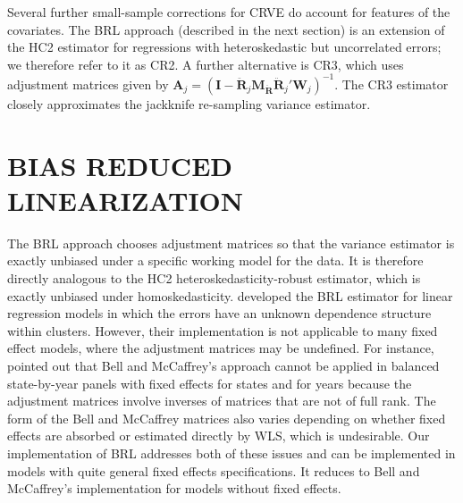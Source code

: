 \documentclass[12pt]{article}\usepackage[]{graphicx}\usepackage[]{color}
\newcommand{\bm}{\mathbf}
\begin{document}
Several further small-sample corrections for CRVE do account for features of the covariates.
The BRL approach (described in the next section) is an extension of the HC2 estimator for regressions with heteroskedastic but uncorrelated errors; we therefore refer to it as CR2. 
A further alternative is CR3, which uses adjustment matrices given by $\bm{A}_j = \left(\bm{I} - \bm{\ddot{R}}_j \bm{M_{\ddot{R}}}\bm{\ddot{R}}_j'\bm{W}_j\right)^{-1}$. The CR3 estimator closely approximates the jackknife re-sampling variance estimator. 

\section{BIAS REDUCED LINEARIZATION}
\label{sec:BRL}

The BRL approach chooses adjustment matrices so that the variance estimator is exactly unbiased under a specific working model for the data. 
It is therefore directly analogous to the HC2 heteroskedasticity-robust estimator, which is exactly unbiased under homoskedasticity. 
\citet{Bell2002bias} developed the BRL estimator for linear regression models in which the errors have an unknown dependence structure within clusters. 
However, their implementation is not applicable to many fixed effect models, where the adjustment matrices may be undefined. 
For instance, \citet{Angrist2009mostly} pointed out that Bell and McCaffrey's approach cannot be applied in balanced state-by-year panels with fixed effects for states and for years because the adjustment matrices involve inverses of matrices that are not of full rank.
The form of the Bell and McCaffrey matrices also varies depending on whether fixed effects are absorbed or estimated directly by WLS, which is undesirable. Our implementation of BRL addresses both of these issues and can be implemented in models with quite general fixed effects specifications. It reduces to Bell and McCaffrey's implementation for models without fixed effects. 
\end{document}
